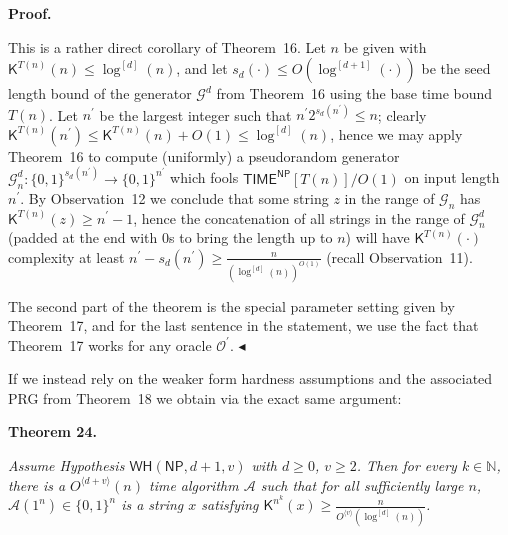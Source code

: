 


\par\medskip\noindent\textbf{Proof.}\par




This is a rather direct corollary of Theorem 16. Let $n$ be given with ${\mathsf{K}}^{T(n)}(n)\leq\log^{[d]}(n)$, and let $s_{d}(\cdot)\leq O(\log^{[d+1]}(\cdot))$ be the seed length bound of the generator $\mathcal{G}^{d}$ from Theorem 16 using the base time bound $T(n)$. Let $n^{\prime}$ be the largest integer such that $n^{\prime}2^{s_{d}(n^{\prime})}\leq n$; clearly ${\mathsf{K}}^{T(n)}(n^{\prime})\leq{\mathsf{K}}^{T(n)}(n)+O(1)\leq\log^{[d]}(n)$, hence we may apply Theorem 16 to compute (uniformly) a pseudorandom generator $\mathcal{G}^{d}_{n}:\{0,1\}^{s_{d}(n^{\prime})}\to\{0,1\}^{n^{\prime}}$ which fools ${\mathsf{TIME}}^{{\mathsf{NP}}}[T(n)]/O(1)$ on input length $n^{\prime}$. By Observation 12 we conclude that some string $z$ in the range of $\mathcal{G}_{n}$ has ${\mathsf{K}}^{T(n)}(z)\geq n^{\prime}-1$, hence the concatenation of all strings in the range of $\mathcal{G}^{d}_{n}$ (padded at the end with $0$s to bring the length up to $n$) will have ${\mathsf{K}}^{T(n)}(\cdot)$ complexity at least $n^{\prime}-s_{d}(n^{\prime})\geq\frac{n}{(\log^{[d]}(n))^{O(1)}}$ (recall Observation 11).\par




The second part of the theorem is the special parameter setting given by Theorem 17, and for the last sentence in the statement, we use the fact that Theorem 17 works for any oracle $\mathcal{O^{\prime}}$.
$\blacktriangleleft$\par




If we instead rely on the weaker form hardness assumptions and the associated PRG from Theorem 18 we obtain via the exact same argument:\par





\par\medskip\noindent\textbf{
\textbf{Theorem 24}\textbf{.}
}\par



\emph{Assume Hypothesis $\mathsf{WH}({\mathsf{NP}},d+1,v)$ with $d\geq 0$, $v\geq 2$. Then for every $k\in\mathbb{N}$, there is a $O^{\langle d+v\rangle}(n)$ time algorithm $\mathcal{A}$ such that for all sufficiently large $n$, $\mathcal{A}(1^{n})\in\{0,1\}^{n}$ is a string $x$ satisfying ${\mathsf{K}}^{n^{k}}(x)\geq\frac{n}{O^{\langle v\rangle}(\log^{[d]}(n))}$.}\par




